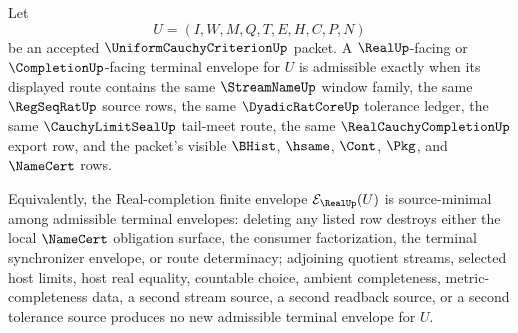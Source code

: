 \begin{theorem}
\label{thm:uniform-cauchy-criterion-real-envelope-source-minimality}
Let
$$
U=(I,W,M,Q,T,E,H,C,P,N)
$$
be an accepted $\UniformCauchyCriterionUp$ packet. A $\RealUp$-facing or $\CompletionUp$-facing terminal envelope for $U$ is admissible exactly when its displayed route contains the same $\StreamNameUp$ window family, the same $\RegSeqRatUp$ source rows, the same $\DyadicRatCoreUp$ tolerance ledger, the same $\CauchyLimitSealUp$ tail-meet route, the same $\RealCauchyCompletionUp$ export row, and the packet's visible $\BHist$, $\hsame$, $\Cont$, $\Pkg$, and $\NameCert$ rows.

Equivalently, the Real-completion finite envelope $\mathcal{E}_{\RealUp}(U)$ is source-minimal among admissible terminal envelopes: deleting any listed row destroys either the local $\NameCert$ obligation surface, the consumer factorization, the terminal synchronizer envelope, or route determinacy; adjoining quotient streams, selected host limits, host real equality, countable choice, ambient completeness, metric-completeness data, a second stream source, a second readback source, or a second tolerance source produces no new admissible terminal envelope for $U$.
\end{theorem}
